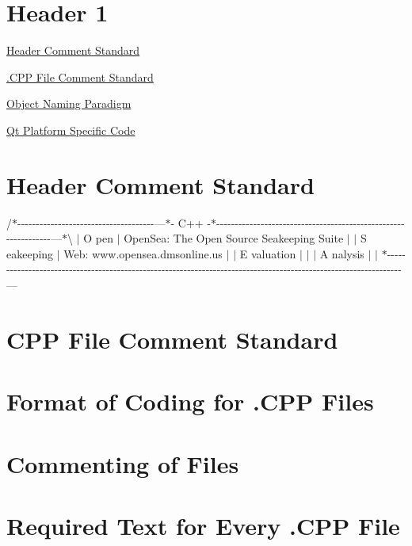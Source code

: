 \section*{Header 1}

\hyperlink{HeaderComment}{Header Comment Standard}

\hyperlink{CPP_Comments}{.C\-P\-P File Comment Standard}

\hyperlink{ObjectParadigm}{Object Naming Paradigm}

\hyperlink{Qt_Platform_Code}{Qt Platform Specific Code} \hypertarget{HeaderComment}{}\section{Header Comment Standard}\label{HeaderComment}
/$\ast$-\/-\/-\/-\/-\/-\/-\/-\/-\/-\/-\/-\/-\/-\/-\/-\/-\/-\/-\/-\/-\/-\/-\/-\/-\/-\/-\/-\/-\/-\/-\/-\/-\/-\/-\/-\/-\/---$\ast$-\/ C++ -\/$\ast$-\/-\/-\/-\/-\/-\/-\/-\/-\/-\/-\/-\/-\/-\/-\/-\/-\/-\/-\/-\/-\/-\/-\/-\/-\/-\/-\/-\/-\/-\/-\/-\/-\/-\/-\/-\/-\/-\/-\/-\/-\/-\/-\/-\/-\/-\/-\/-\/-\/-\/-\/-\/-\/-\/-\/-\/-\/-\/-\/-\/-\/-\/-\/---$\ast$\textbackslash{} $|$ O pen $|$ Open\-Sea\-: The Open Source Seakeeping Suite $|$ $|$ S eakeeping $|$ Web\-: www.\-opensea.\-dmsonline.\-us $|$ $|$ E valuation $|$ $|$ $|$ A nalysis $|$ $|$ $\ast$-\/-\/-\/-\/-\/-\/-\/-\/-\/-\/-\/-\/-\/-\/-\/-\/-\/-\/-\/-\/-\/-\/-\/-\/-\/-\/-\/-\/-\/-\/-\/-\/-\/-\/-\/-\/-\/-\/-\/-\/-\/-\/-\/-\/-\/-\/-\/-\/-\/-\/-\/-\/-\/-\/-\/-\/-\/-\/-\/-\/-\/-\/-\/-\/-\/-\/-\/-\/-\/-\/-\/-\/-\/-\/-\/-\/-\/-\/-\/-\/-\/-\/-\/-\/-\/-\/-\/-\/-\/-\/-\/-\/-\/-\/-\/-\/-\/-\/-\/-\/-\/-\/-\/-\/-\/-\/-\/-\/-\/-\/-\/-\/--- \hypertarget{CPP_Comments}{}\section{C\-P\-P File Comment Standard}\label{CPP_Comments}
\section*{Format of Coding for .C\-P\-P Files}

\section*{Commenting of Files}

\section*{Required Text for Every .C\-P\-P File}

